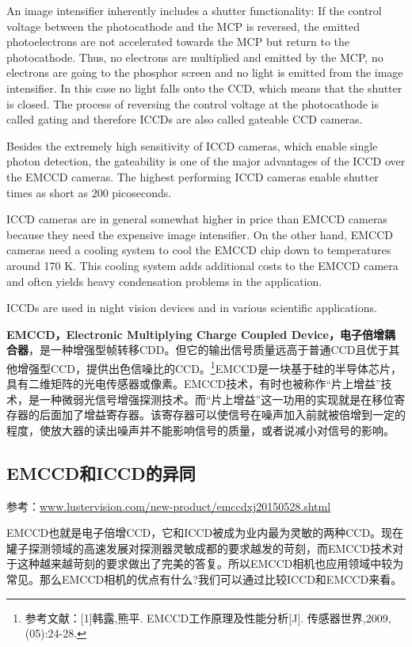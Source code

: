 An image intensifier inherently includes a shutter functionality: If the control voltage between the photocathode and the MCP is reversed, the emitted photoelectrons are not accelerated towards the MCP but return to the photocathode. Thus, no electrons are multiplied and emitted by the MCP, no electrons are going to the phosphor screen and no light is emitted from the image intensifier. In this case no light falls onto the CCD, which means that the shutter is closed. The process of reversing the control voltage at the photocathode is called gating and therefore ICCDs are also called gateable CCD cameras.

Besides the extremely high sensitivity of ICCD cameras, which enable single photon detection, the gateability is one of the major advantages of the ICCD over the EMCCD cameras. The highest performing ICCD cameras enable shutter times as short as 200 picoseconds.

ICCD cameras are in general somewhat higher in price than EMCCD cameras because they need the expensive image intensifier. On the other hand, EMCCD cameras need a cooling system to cool the EMCCD chip down to temperatures around 170 K. This cooling system adds additional costs to the EMCCD camera and often yields heavy condensation problems in the application.

ICCDs are used in night vision devices and in various scientific applications.


\textbf{EMCCD，Electronic Multiplying Charge Coupled Device，电子倍增耦合器}，是一种增强型帧转移CDD。但它的输出信号质量远高于普通CCD且优于其他增强型CCD，提供出色信噪比的CCD。\footnote{参考文献：[1]韩露,熊平. EMCCD工作原理及性能分析[J]. 传感器世界,2009,(05):24-28.}EMCCD是一块基于硅的半导体芯片，具有二维矩阵的光电传感器或像素。EMCCD技术，有时也被称作“片上增益”技术，是一种微弱光信号增强探测技术。而“片上增益”这一功用的实现就是在移位寄存器的后面加了增益寄存器。该寄存器可以使信号在噪声加入前就被倍增到一定的程度，使放大器的读出噪声并不能影响信号的质量，或者说减小对信号的影响。


\subsection{EMCCD和ICCD的异同}
参考：\url{www.lustervision.com/new-product/emccdxj20150528.shtml}

EMCCD也就是电子倍增CCD，它和ICCD被成为业内最为灵敏的两种CCD。现在罐子探测领域的高速发展对探测器灵敏成都的要求越发的苛刻，而EMCCD技术对于这种越来越苛刻的要求做出了完美的答复。所以EMCCD相机也应用领域中较为常见。那么EMCCD相机的优点有什么?我们可以通过比较ICCD和EMCCD来看。


